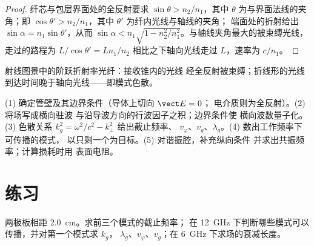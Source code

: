 \begin{proof}
纤芯与包层界面处的全反射要求 $\sin\theta >
n_2/n_1$，其中 $\theta$ 为与界面法线的夹角；即 $\cos
\theta' > n_2/n_1$，其中 $\theta'$ 为纤内光线与轴线的夹角；
端面处的折射给出 $\sin\alpha = n_1\sin\theta'$，从而 $\sin\alpha < n_1\sqrt{1
- n_2^2/n_1^2}$。与轴线夹角最大的被束缚光线，走过的路程为 $L/\cos\theta' = Ln_1/n_2$
相比之下轴向光线走过 $L$，速率为 $c/n_1$。
\end{proof}

\begin{omfigure}

{\small 射线图景中的阶跃折射率光纤：接收锥内的光线
经全反射被束缚；折线形的光线
到达时间晚于轴向光线——即模式色散。}
\end{omfigure}

\begin{method}[导波问题的计算步骤]\label{met:b2:guided-waves:method}
(1) 确定管壁及其边界条件（导体上切向 $\vect E = 0$；
电介质则为全反射）。(2) 将场写成横向驻波
与沿导波方向的行波因子之积；边界条件使
横向波数量子化。
(3) 色散关系 $k_g^2 = \omega^2/c^2 - k_\perp^2$ 给出截止频率、
$v_\varphi$、$v_g$、$\lambda_g$。(4) 数出工作频率下可传播的模式，
以只剩一个为目标。(5) 对谐振腔，补充纵向条件
并求出共振频率；计算损耗时用
表面电阻。
\end{method}

\section{练习}

\begin{exercise}[$\star$]\label{exo:b2:guided-waves:1}
两极板相距 \qty{2.0}{cm}。求前三个模式的截止频率；
在 \qty{12}{GHz} 下判断哪些模式可以传播，并对第一个模式求 $k_g$，
$\lambda_g$、$v_\varphi$、$v_g$；在 \qty{6}{GHz} 下求场的衰减长度。
\end{exercise}

